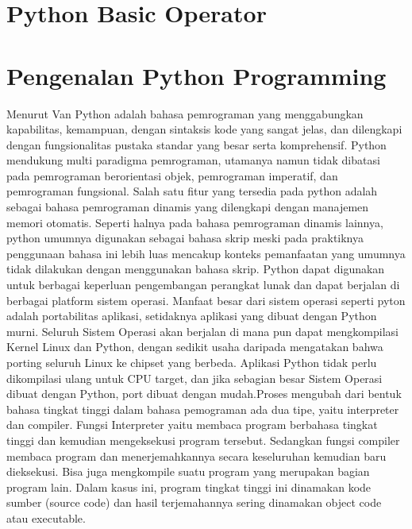 
\section{Python Basic Operator}
\section{Pengenalan Python Programming}
Menurut Van Python adalah bahasa pemrograman yang menggabungkan kapabilitas, kemampuan, dengan sintaksis kode yang sangat jelas, dan dilengkapi dengan fungsionalitas pustaka standar yang besar serta komprehensif. Python mendukung multi paradigma pemrograman, utamanya namun tidak dibatasi pada pemrograman berorientasi objek, pemrograman imperatif, dan pemrograman fungsional. Salah satu fitur yang tersedia pada python adalah sebagai bahasa pemrograman dinamis yang dilengkapi dengan manajemen memori otomatis. Seperti halnya pada bahasa pemrograman dinamis lainnya, python umumnya digunakan sebagai bahasa skrip meski pada praktiknya penggunaan bahasa ini lebih luas mencakup konteks pemanfaatan yang umumnya tidak dilakukan dengan menggunakan bahasa skrip. Python dapat digunakan untuk berbagai keperluan pengembangan perangkat lunak dan dapat berjalan di berbagai platform sistem operasi. Manfaat besar dari sistem operasi seperti pyton adalah portabilitas aplikasi, setidaknya aplikasi yang dibuat dengan Python murni. Seluruh Sistem Operasi akan berjalan di mana pun dapat mengkompilasi Kernel Linux dan Python, dengan sedikit usaha daripada mengatakan bahwa porting seluruh Linux ke chipset yang berbeda. Aplikasi Python tidak perlu dikompilasi ulang untuk CPU target, dan jika sebagian besar Sistem Operasi dibuat dengan Python, port dibuat dengan mudah.Proses mengubah dari bentuk bahasa tingkat tinggi dalam bahasa pemograman ada dua tipe, yaitu interpreter dan compiler. Fungsi Interpreter yaitu membaca program berbahasa tingkat tinggi dan kemudian mengeksekusi program tersebut. Sedangkan fungsi compiler membaca program dan menerjemahkannya secara keseluruhan kemudian baru dieksekusi. Bisa juga mengkompile suatu program yang merupakan bagian program lain. Dalam kasus ini, program tingkat tinggi ini dinamakan kode sumber (source code) dan hasil terjemahannya sering dinamakan object code atau executable.  \cite{van2007python}

